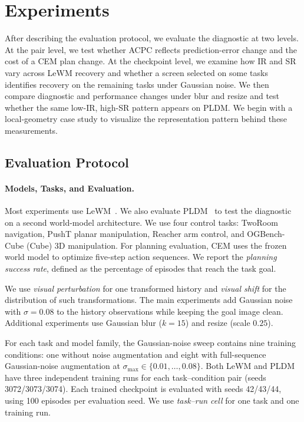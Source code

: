 \documentclass[10pt]{article}
\newcommand{\stdmax}{\ensuremath{\sigma_{\max}}}
\begin{document}
\section{Experiments}\label{sec:exp}

After describing the evaluation protocol, we evaluate the diagnostic at two
levels. At the pair level, we test whether ACPC reflects prediction-error
change and the cost of a CEM plan change. At the checkpoint level, we examine
how IR and SR vary across LeWM recovery and whether a screen selected on some
tasks identifies recovery on the remaining tasks under Gaussian noise. We
then compare diagnostic and performance changes under blur and resize and
test whether the same low-IR, high-SR pattern appears on PLDM. We begin with a
local-geometry case study to visualize the representation pattern behind
these measurements.

\subsection{Evaluation Protocol}\label{sec:bg}

\paragraph{Models, Tasks, and Evaluation.}
Most experiments use LeWM~\cite{maes2026lewm}. We also evaluate
PLDM~\cite{sobal2025stresstesting}
to test the diagnostic on a second world-model architecture. We use four
control tasks: TwoRoom navigation, PushT planar manipulation, Reacher arm
control, and OGBench-Cube (Cube) 3D manipulation. For planning evaluation,
CEM uses the frozen world model to optimize five-step action sequences. We
report the \emph{planning success rate}, defined as the percentage of episodes
that reach the task goal.

We use \emph{visual perturbation} for one transformed history and
\emph{visual shift} for the distribution of such transformations. The main
experiments add Gaussian noise with $\sigma=0.08$ to the history observations
while keeping the goal image clean. Additional experiments use Gaussian blur
($k=15$) and resize (scale $0.25$).

For each task and model family, the Gaussian-noise sweep contains nine
training conditions: one without noise augmentation and eight with
full-sequence Gaussian-noise augmentation at
$\stdmax{}\in\{0.01,\ldots,0.08\}$. Both LeWM and PLDM have three independent
training runs for each task--condition pair (seeds 3072/3073/3074). Each
trained checkpoint is evaluated with seeds 42/43/44, using 100 episodes per
evaluation seed. We use \emph{task--run cell} for one task and one training
run.
\end{document}
